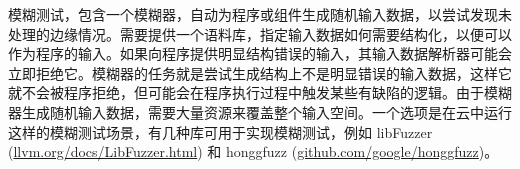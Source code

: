 
模糊测试，包含一个模糊器，自动为程序或组件生成随机输入数据，以尝试发现未处理的边缘情况。需要提供一个语料库，指定输入数据如何需要结构化，以便可以作为程序的输入。如果向程序提供明显结构错误的输入，其输入数据解析器可能会立即拒绝它。模糊器的任务就是尝试生成结构上不是明显错误的输入数据，这样它就不会被程序拒绝，但可能会在程序执行过程中触发某些有缺陷的逻辑。由于模糊器生成随机输入数据，需要大量资源来覆盖整个输入空间。一个选项是在云中运行这样的模糊测试场景，有几种库可用于实现模糊测试，例如 libFuzzer (\url{llvm.org/docs/LibFuzzer.html}) 和 honggfuzz (\url{github.com/google/honggfuzz})。
